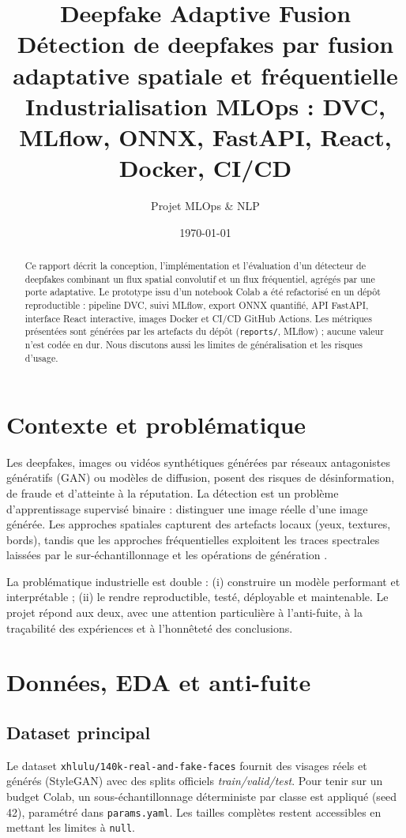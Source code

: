 \documentclass[11pt,a4paper]{article}
\title{\textbf{Deepfake Adaptive Fusion}\\[0.3em]
\large Détection de deepfakes par fusion adaptative spatiale et fréquentielle\\
\large Industrialisation MLOps : DVC, MLflow, ONNX, FastAPI, React, Docker, CI/CD}
\author{Projet MLOps \& NLP}
\date{\today}
\begin{document}
\maketitle

\begin{abstract}
Ce rapport décrit la conception, l'implémentation et l'évaluation d'un détecteur
de deepfakes combinant un flux spatial convolutif et un flux fréquentiel, agrégés
par une porte adaptative. Le prototype issu d'un notebook Colab a été refactorisé
en un dépôt reproductible : pipeline DVC, suivi MLflow, export ONNX quantifié,
API FastAPI, interface React interactive, images Docker et CI/CD GitHub Actions.
Les métriques présentées sont générées par les artefacts du dépôt
(\texttt{reports/}, MLflow) ; aucune valeur n'est codée en dur. Nous discutons
aussi les limites de généralisation et les risques d'usage.
\end{abstract}

\tableofcontents
\newpage

\section{Contexte et problématique}
Les deepfakes, images ou vidéos synthétiques générées par réseaux antagonistes
génératifs (GAN) ou modèles de diffusion, posent des risques de désinformation,
de fraude et d'atteinte à la réputation. La détection est un problème
d'apprentissage supervisé binaire : distinguer une image réelle d'une image
générée. Les approches spatiales capturent des artefacts locaux (yeux, textures,
bords), tandis que les approches fréquentielles exploitent les traces spectrales
laissées par le sur-échantillonnage et les opérations de génération
\cite{wang2020cnn,durall2020watch,frank2020leveraging}.

La problématique industrielle est double : (i) construire un modèle performant et
interprétable ; (ii) le rendre reproductible, testé, déployable et maintenable.
Le projet répond aux deux, avec une attention particulière à l'anti-fuite, à la
traçabilité des expériences et à l'honnêteté des conclusions.

\section{Données, EDA et anti-fuite}
\subsection{Dataset principal}
Le dataset \texttt{xhlulu/140k-real-and-fake-faces} \cite{kaggle140k} fournit des
visages réels et générés (StyleGAN) avec des splits officiels
\textit{train/valid/test}. Pour tenir sur un budget Colab, un sous-échantillonnage
déterministe par classe est appliqué (seed 42), paramétré dans
\texttt{params.yaml}. Les tailles complètes restent accessibles en mettant les
limites à \texttt{null}.
\end{document}
